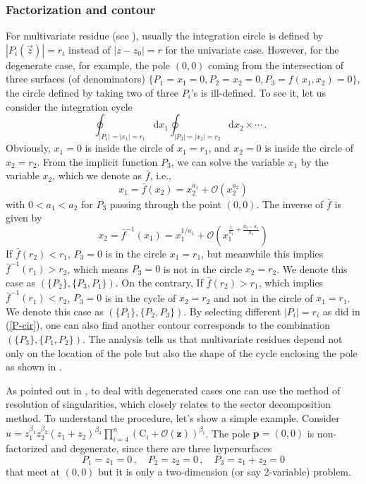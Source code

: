 \documentclass[a4paper,11pt]{article}
\newcommand{\nd}{\mathrm{d}}
\newcommand{\be}{\begin{equation}}
\newcommand{\ee}{\end{equation}}
\def\eref#1{(\ref{#1})}
\begin{document}
\subsubsection{Factorization and contour}

For multivariate residue 
(see \cite{Johansson:2015ava,Larsen:2017aqb}), usually the integration circle is defined by $|P_i(\vec{z})|=r_i$ instead of $|z-z_0|=r$
for the univariate case. However, for the degenerate case, for example, the pole $(0,0)$
coming from the intersection of three surfaces  (of denominators) $\{P_1=x_1=0,P_2=x_2=0, P_3=f(x_1,x_2)=0\}$,
the circle defined by taking two of three $P_i$'s is ill-defined. 
To see it, let us consider the integration cycle
\begin{equation}
\oint_{|P_1|=|x_1|=r_1} \nd x_1 \oint_{|P_2|=|x_2|=r_2} \nd x_2 \times \cdots  \, .~~~\label{P-cir}
\end{equation}
Obviously, $x_1=0$ is inside the circle of $x_1=r_1$, and $x_2=0$ is inside the circle of $x_2=r_2$. 
From the implicit function $P_3$, we can solve the variable $x_1$ by the variable $x_2$, which we 
denote as $\bar{f}$, i.e.,
%
\be x_1 = \bar{f}(x_2) = x_2^{a_1} +\mathcal{O}(x_2^{a_2}) \ee
%
with $0<a_1<a_2$ for $P_3$  passing through the point $(0,0)$.
The inverse of $\bar{f}$ is given by 
%
\be x_2 = \bar{f}^{-1}(x_1) = x_1^{1/a_1} +\mathcal{O}(x_1^{\frac{1}{a_1}+\frac{a_2-a_1}{a_1}})\ee
%
If $\bar{f}(r_2)<r_1$,  $P_3=0$ is in the circle $x_1=r_1$, but meanwhile this implies $\bar{f}^{-1}(r_1)>r_2$, which means $P_3=0$ is not in the circle $x_2=r_2$. We denote this case as $(\{P_2\},\{P_3,P_1\})$. On the contrary, If $\bar{f}(r_2)>r_1$, which implies $\bar{f}^{-1}(r_1)<r_2$, $P_3=0$ is in the cycle of $x_2=r_2$ and not in the circle of $x_1=r_1$. We denote this case as $(\{P_1\},\{P_2,P_3\})$. By selecting different $|P_i|=r_i$ as did in \eref{P-cir}, one can also find another contour corresponds to the combination $(\{P_3\},\{P_1,P_2\})$.
The  analysis tells us  that multivariate residues depend  not only on the location of the pole but also
 the shape of the cycle enclosing the pole as shown in \cite{Johansson:2015ava, Larsen:2017aqb}. 

As pointed out in \cite{Chestnov:2022xsy}, to deal with
	degenerated cases one can use the method of resolution of singularities, which closely relates to the sector
	decomposition method.  To understand the procedure,
	let's show a simple example. Consider $u=z_1^{\beta_1} z_2^{\beta_2} (z_1+z_2)^{\beta_3}\prod_{i=4}^n(\text{C}_i+\mathcal{O}(\bm{z}))^{\beta_i}$. The pole $\bm{p}=(0,0)$ is non-factorized and degenerate, since there are three hypersurfaces 
\begin{equation}
P_1=z_1=0\, , \quad P_2=z_2=0\, , \quad  P_3=z_1+z_2=0
\end{equation}
that meet at $(0,0)$ but it is only a two-dimension (or say 2-variable) problem. 
\end{document}
